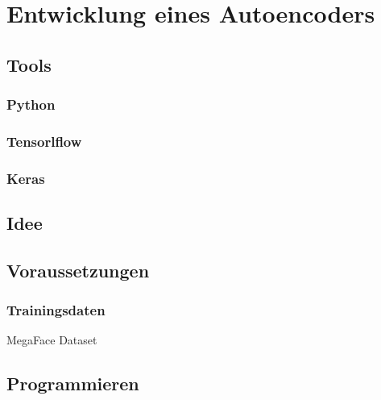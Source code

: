 \documentclass[../main]{subfiles}
\begin{document}
\section{Entwicklung eines Autoencoders}
\subsection{Tools}
\subsubsection{Python}
\subsubsection{Tensorlflow}
\subsubsection{Keras}
\subsection{Idee}
\subsection{Voraussetzungen}
\subsubsection{Trainingsdaten}
MegaFace Dataset
\subsection{Programmieren}
\end{document}
